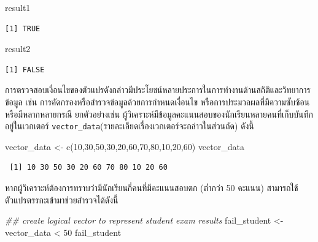 \documentclass[
  a4paper,
]{book}
\newenvironment{Shaded}{\begin{snugshade}}{\end{snugshade}}
\newcommand{\DecValTok}[1]{\textcolor[rgb]{0.68,0.00,0.00}{#1}}
\newcommand{\DocumentationTok}[1]{\textcolor[rgb]{0.37,0.37,0.37}{\textit{#1}}}
\newcommand{\FunctionTok}[1]{\textcolor[rgb]{0.28,0.35,0.67}{#1}}
\newcommand{\NormalTok}[1]{\textcolor[rgb]{0.00,0.23,0.31}{#1}}
\newcommand{\OtherTok}[1]{\textcolor[rgb]{0.00,0.23,0.31}{#1}}
\newcommand{\SpecialCharTok}[1]{\textcolor[rgb]{0.37,0.37,0.37}{#1}}
\begin{document}
\begin{Shaded}
\begin{Highlighting}[]
\NormalTok{result1}
\end{Highlighting}
\end{Shaded}

\begin{verbatim}
[1] TRUE
\end{verbatim}

\begin{Shaded}
\begin{Highlighting}[]
\NormalTok{result2}
\end{Highlighting}
\end{Shaded}

\begin{verbatim}
[1] FALSE
\end{verbatim}

การตรวจสอบเงื่อนไขของตัวแปรดังกล่าวมีประโยชน์หลายประการในการทำงานด้านสถิติและวิทยาการข้อมูล
เช่น การคัดกรองหรือสำรวจข้อมูลด้วยการกำหนดเงื่อนไข
หรือการประมวลผลที่มีความซับซ้อนหรือมีหลากหลายกรณี ยกตัวอย่างเช่น
ผู้วิเคราะห์มีข้อมูลคะแนนสอบของนักเรียนหลายคนที่เก็บบันทึกอยู่ในเวกเตอร์
\texttt{vector\_data}(รายละเอียดเรื่องเวกเตอร์จะกล่าวในส่วนถัด) ดังนี้

\begin{Shaded}
\begin{Highlighting}[]
\NormalTok{vector\_data }\OtherTok{\textless{}{-}} \FunctionTok{c}\NormalTok{(}\DecValTok{10}\NormalTok{,}\DecValTok{30}\NormalTok{,}\DecValTok{50}\NormalTok{,}\DecValTok{30}\NormalTok{,}\DecValTok{20}\NormalTok{,}\DecValTok{60}\NormalTok{,}\DecValTok{70}\NormalTok{,}\DecValTok{80}\NormalTok{,}\DecValTok{10}\NormalTok{,}\DecValTok{20}\NormalTok{,}\DecValTok{60}\NormalTok{)}
\NormalTok{vector\_data}
\end{Highlighting}
\end{Shaded}

\begin{verbatim}
 [1] 10 30 50 30 20 60 70 80 10 20 60
\end{verbatim}

หากผู้วิเคราะห์ต้องการทราบว่ามีนักเรียนกี่คนที่มีคะแนนสอบตก\hspace{0pt} (ต่ำกว่า 50
คะแนน) สามารถใช้ตัวแปรตรรกะเข้ามาช่วยสำรวจได้ดังนี้

\begin{Shaded}
\begin{Highlighting}[]
\DocumentationTok{\#\# create logical vector to represent student exam results}
\NormalTok{fail\_student }\OtherTok{\textless{}{-}}\NormalTok{ vector\_data }\SpecialCharTok{\textless{}} \DecValTok{50}
\NormalTok{fail\_student}
\end{Highlighting}
\end{Shaded}
\end{document}
